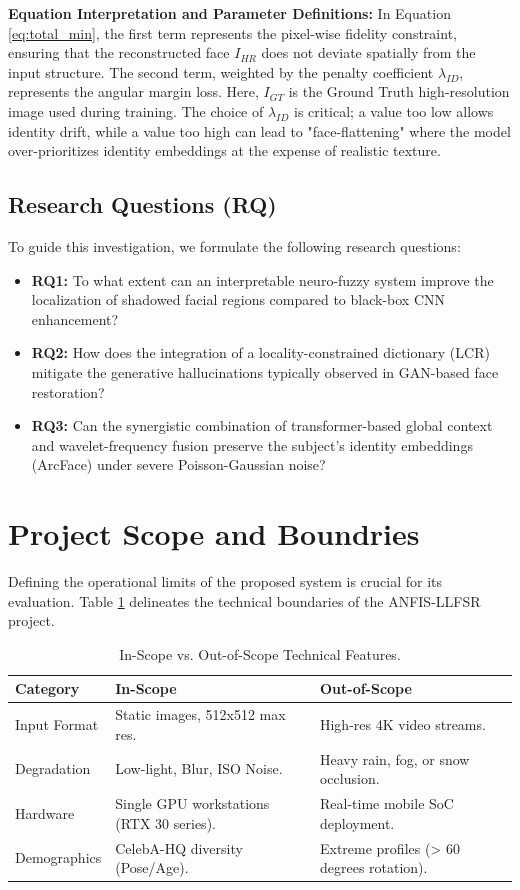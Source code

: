 \textbf{Equation Interpretation and Parameter Definitions:} In Equation \ref{eq:total_min}, the first term represents the pixel-wise fidelity constraint, ensuring that the reconstructed face $I_{HR}$ does not deviate spatially from the input structure. The second term, weighted by the penalty coefficient $\lambda_{ID}$, represents the angular margin loss. Here, $I_{GT}$ is the Ground Truth high-resolution image used during training. The choice of $\lambda_{ID}$ is critical; a value too low allows identity drift, while a value too high can lead to "face-flattening" where the model over-prioritizes identity embeddings at the expense of realistic texture.

\subsection{Research Questions (RQ)}
To guide this investigation, we formulate the following research questions:
\begin{itemize}
    \item \textbf{RQ1:} To what extent can an interpretable neuro-fuzzy system improve the localization of shadowed facial regions compared to black-box CNN enhancement?
    \item \textbf{RQ2:} How does the integration of a locality-constrained dictionary (LCR) mitigate the generative hallucinations typically observed in GAN-based face restoration?
    \item \textbf{RQ3:} Can the synergistic combination of transformer-based global context and wavelet-frequency fusion preserve the subject's identity embeddings (ArcFace) under severe Poisson-Gaussian noise?
\end{itemize}

\section{Project Scope and Boundries}
Defining the operational limits of the proposed system is crucial for its evaluation. Table \ref{tab:scope} delineates the technical boundaries of the ANFIS-LLFSR project.

\begin{table}[htbp]
    \centering
    \caption{In-Scope vs. Out-of-Scope Technical Features.}
    \label{tab:scope}
    \begin{tabular}{lp{5cm}p{5cm}}
        \toprule
        \textbf{Category} & \textbf{In-Scope} & \textbf{Out-of-Scope} \\
        \midrule
        Input Format & Static images, 512x512 max res. & High-res 4K video streams. \\
        Degradation & Low-light, Blur, ISO Noise. & Heavy rain, fog, or snow occlusion. \\
        Hardware & Single GPU workstations (RTX 30 series). & Real-time mobile SoC deployment. \\
        Demographics & CelebA-HQ diversity (Pose/Age). & Extreme profiles (> 60 degrees rotation). \\
        \bottomrule
    \end{tabular}
\end{table}

